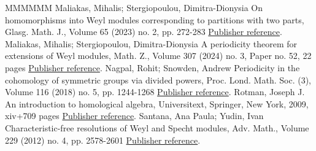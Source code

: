 \begin{thebibliography}{MMMMMM}
 Maliakas, Mihalis; Stergiopoulou, Dimitra-Dionysia On homomorphisms into Weyl modules corresponding to partitions with two parts, Glasg. Math. J., Volume 65 (2023) no. 2, pp. 272-283 \href{https://alco.centre-mersenne.org/articles/10.5802/alco.397/#MS3}{Publisher reference}.
 Maliakas, Mihalis; Stergiopoulou, Dimitra-Dionysia A periodicity theorem for extensions of Weyl modules, Math. Z., Volume 307 (2024) no. 3, Paper no. 52, 22 pages \href{https://alco.centre-mersenne.org/articles/10.5802/alco.397/#MS4}{Publisher reference}.
 Nagpal, Rohit; Snowden, Andrew Periodicity in the cohomology of symmetric groups via divided powers, Proc. Lond. Math. Soc. (3), Volume 116 (2018) no. 5, pp. 1244-1268 \href{https://alco.centre-mersenne.org/articles/10.5802/alco.397/#NS}{Publisher reference}.
 Rotman, Joseph J. An introduction to homological algebra, Universitext, Springer, New York, 2009, xiv+709 pages \href{https://alco.centre-mersenne.org/articles/10.5802/alco.397/#Ro}{Publisher reference}.
 Santana, Ana Paula; Yudin, Ivan Characteristic-free resolutions of Weyl and Specht modules, Adv. Math., Volume 229 (2012) no. 4, pp. 2578-2601 \href{https://alco.centre-mersenne.org/articles/10.5802/alco.397/#SY}{Publisher reference}.
\end{thebibliography}
